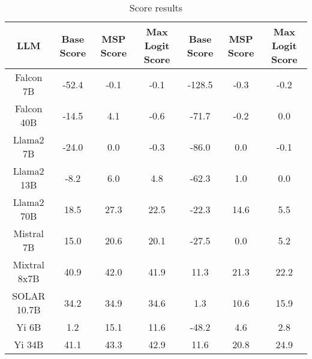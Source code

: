 \renewcommand\arraystretch{1.2}
\begin{table*}
\centering
\begin{tabular}{c|c|c|c|c|c|c}
LLM & Base Score & MSP Score & Max Logit Score & Base Score & MSP Score & Max Logit Score\\ \hline
Falcon 7B & -52.4 & -0.1 & -0.1 & -128.5 & -0.3 & -0.2\\
Falcon 40B & -14.5 & 4.1 & -0.6 & -71.7 & -0.2 & 0.0\\
Llama2 7B & -24.0 & 0.0 & -0.3 & -86.0 & 0.0 & -0.1\\
Llama2 13B & -8.2 & 6.0 & 4.8 & -62.3 & 1.0 & 0.0\\
Llama2 70B & 18.5 & 27.3 & 22.5 & -22.3 & 14.6 & 5.5\\
Mistral 7B & 15.0 & 20.6 & 20.1 & -27.5 & 0.0 & 5.2\\
Mixtral 8x7B & 40.9 & 42.0 & 41.9 & 11.3 & 21.3 & 22.2\\
SOLAR 10.7B & 34.2 & 34.9 & 34.6 & 1.3 & 10.6 & 15.9\\
Yi 6B & 1.2 & 15.1 & 11.6 & -48.2 & 4.6 & 2.8\\
Yi 34B & 41.1 & 43.3 & 42.9 & 11.6 & 20.8 & 24.9\\
\hline
\end{tabular}
\caption{Score results}
\end{table*}
\label{tab:score}
